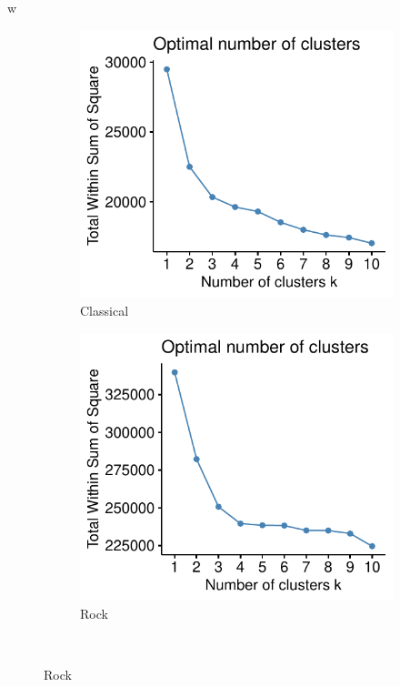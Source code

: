 w\documentclass[11pt, oneside]{article}
\begin{document}
\begin{figure}[h!]
\centering  
\begin{subfigure}[b]{0.5\textwidth}
        \includegraphics[width=\textwidth]{classic_elbow2.pdf} 
        \caption{Classical}
    \end{subfigure}%
    \begin{subfigure}[b]{0.5\textwidth}
        \includegraphics[width=\textwidth]{rock_elbow.pdf} 
        \caption{Rock}
    \end{subfigure} \\

\end{figure}
\end{document}
